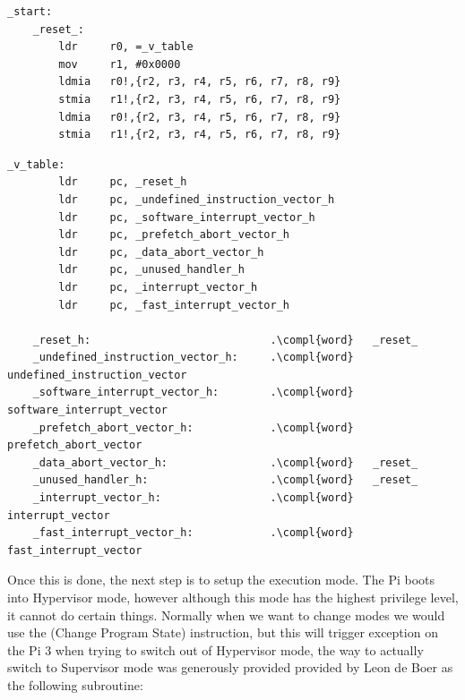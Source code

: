 \documentclass[12pt, svgnames]{book}
\begin{document}
\begin{lstlisting}[language=ASM, title={Code taken from the \href{http://www.valvers.com/open-software/raspberry-pi/step04-bare-metal-programming-in-c-pt4/}{Valvers Ttorial}},captionpos=b]
	_start:
	_reset_:
		ldr     r0, =_v_table
		mov     r1, #0x0000
		ldmia   r0!,{r2, r3, r4, r5, r6, r7, r8, r9}
		stmia   r1!,{r2, r3, r4, r5, r6, r7, r8, r9}
		ldmia   r0!,{r2, r3, r4, r5, r6, r7, r8, r9}
		stmia   r1!,{r2, r3, r4, r5, r6, r7, r8, r9}
\end{lstlisting}

\newpage

\hypertarget{IVT}{}
\begin{lstlisting}[language=ASM, title=IVT Structure, title={Code taken from the \href{http://www.valvers.com/open-software/raspberry-pi/step04-bare-metal-programming-in-c-pt4/}{Valvers Ttorial}},captionpos=b]
	_v_table:
		ldr     pc, _reset_h
		ldr     pc, _undefined_instruction_vector_h
		ldr     pc, _software_interrupt_vector_h
		ldr     pc, _prefetch_abort_vector_h
		ldr     pc, _data_abort_vector_h
		ldr     pc, _unused_handler_h
		ldr     pc, _interrupt_vector_h
		ldr     pc, _fast_interrupt_vector_h
		
	_reset_h:                            .\compl{word}   _reset_
	_undefined_instruction_vector_h:     .\compl{word}   undefined_instruction_vector
	_software_interrupt_vector_h:        .\compl{word}   software_interrupt_vector
	_prefetch_abort_vector_h:            .\compl{word}   prefetch_abort_vector
	_data_abort_vector_h:                .\compl{word}   _reset_
	_unused_handler_h:                   .\compl{word}   _reset_
	_interrupt_vector_h:                 .\compl{word}   interrupt_vector
	_fast_interrupt_vector_h:            .\compl{word}   fast_interrupt_vector
\end{lstlisting}

Once this is done, the next step is to setup the execution mode. The Pi boots into Hypervisor mode, however although this mode has the highest privilege level, it cannot do certain things. Normally when we want to change modes we would use the  (Change Program State) instruction, but this will trigger exception on the Pi 3 when trying to switch out of Hypervisor mode, the way to actually switch to Supervisor mode was generously provided provided by Leon de Boer as the following subroutine:
\end{document}
